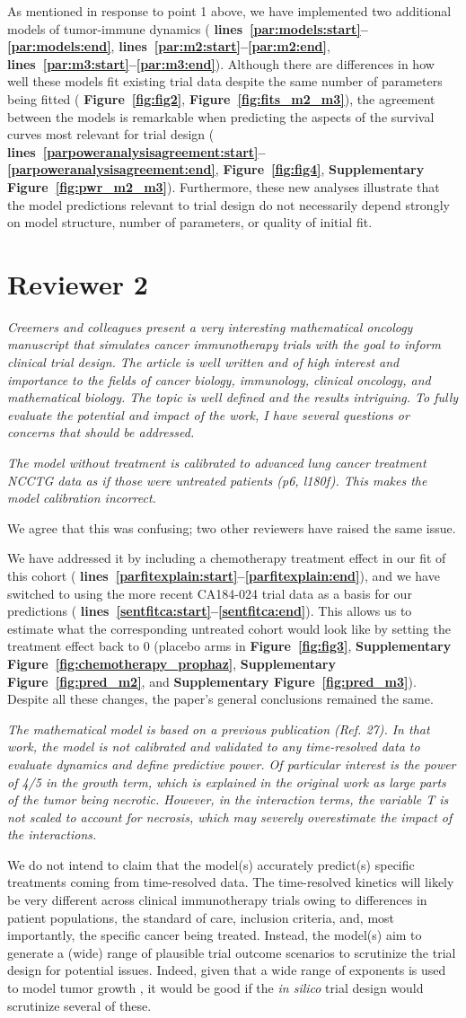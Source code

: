 \documentclass{article}
\newcommand{\revr}[1]{{\color{gray} \itshape #1}}
\newcommand{\auth}[1]{{#1}}
\newcommand{\chng}[1]{{\color{blue!70!black} #1}}
\newcommand{\myref}[2]{{\bfseries\color{red!70!black} Figure~\ref{#1}#2}}
\newcommand{\mysupp}[2]{{\bfseries\color{red!70!black} Supplementary Figure~\ref{#1}#2}}
\newcommand{\lr}[1]{{\bfseries\color{red!70!black} lines~\ref{#1:start}--\ref{#1:end}}}
\newcommand{\untreated}{\auth{We agree that this was confusing; two other reviewers have raised the same issue.}

\chng{We have addressed it by including a chemotherapy treatment effect in our fit of this cohort (\lr{parfitexplain}), and we have switched to using the more recent CA184-024 trial data as a basis for our predictions (\lr{sentfitca}). This allows us to estimate what the corresponding untreated cohort would look like by setting the treatment effect back to 0 (placebo arms in \myref{fig:fig3}{}, \mysupp{fig:chemotherapy_prophaz}{}, \mysupp{fig:pred_m2}{}, and \mysupp{fig:pred_m3}{}). Despite all these changes, the paper's general conclusions remained the same.}}
\begin{document}
\chng{
As mentioned in response to point 1 above, we have implemented two additional models of tumor-immune dynamics \cite{Tsur2020,Bekker2022} (\lr{par:models}, \lr{par:m2}, \lr{par:m3}). Although there are differences in how well these models fit existing trial data despite the same number of parameters being fitted (\myref{fig:fig2}{},\myref{fig:fits_m2_m3}{}), the agreement between the models is remarkable when predicting the aspects of the survival curves most relevant for trial design (\lr{parpoweranalysisagreement},\myref{fig:fig4}{},\mysupp{fig:pwr_m2_m3}{}). Furthermore, these new analyses illustrate that the model predictions relevant to trial design do not necessarily depend strongly on model structure, number of parameters, or quality of initial fit.
}

\section*{Reviewer 2}

\revr{Creemers and colleagues present a very interesting mathematical oncology manuscript that simulates cancer immunotherapy trials with the goal to inform clinical trial design. The article is well written and of high interest and importance to the fields of cancer biology, immunology, clinical oncology, and mathematical biology. The topic is well defined and the results intriguing. To fully evaluate the potential and impact of the work, I have several questions or concerns that should be addressed.}

\revr{The model without treatment is calibrated to advanced lung cancer treatment NCCTG data as if those were untreated patients (p6, l180f). This makes the model calibration incorrect.}

\untreated{}

\revr{The mathematical model is based on a previous publication (Ref. 27). In that work, the model is not calibrated and validated to any time-resolved data to evaluate dynamics and define predictive power.
Of particular interest is the power of 4/5 in the growth term, which is explained in the original work as large parts of the tumor being necrotic. However, in the interaction terms, the variable T is not scaled to account for necrosis, which may severely overestimate the impact of the interactions.}


\auth{We do not intend to claim that the model(s) accurately predict(s) specific treatments coming from time-resolved data. The time-resolved kinetics will likely be very different across clinical immunotherapy trials owing to differences in patient populations, the standard of care, inclusion criteria, and, most importantly, the specific cancer being treated. Instead, the model(s) aim to generate a (wide) range of plausible trial outcome scenarios to scrutinize the trial design for potential issues. Indeed, given that a wide range of exponents is used to model tumor growth \cite{Murphy2016}, it would be good if the \emph{in silico} trial design would scrutinize several of these.}
\end{document}
